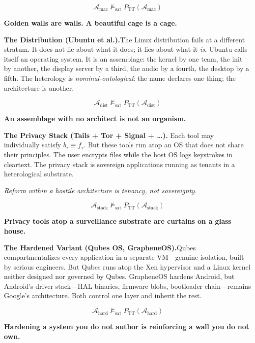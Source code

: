 \documentclass[11pt, oneside]{article}
\newcommand{\isolate}[1]{%
    \vspace{8pt}%
    \begin{center}\itshape #1\end{center}%
    \vspace{8pt}%
}
\newcommand{\verdict}[1]{%
    \vspace{10pt}%
    \begin{center}\textcolor{LogosGold}{\textbf{#1}}\end{center}%
    \vspace{10pt}%
}
\begin{document}
\[
\mathcal{A}_{\mathrm{mac}} \not\models_{\mathrm{sat}}
P_{\mathrm{TT}}(\mathcal{A}_{\mathrm{mac}}) \tag{TT}
\]

\verdict{Golden walls are walls. A beautiful cage is a cage.}

\noindent\textbf{The Distribution (Ubuntu et al.).}\quad The Linux
distribution fails at a different stratum. It does not lie about what
it does; it lies about what it \textit{is}. Ubuntu calls itself an
operating system. It is an assemblage: the kernel by one team, the init
by another, the display server by a third, the audio by a fourth, the
desktop by a fifth. The heterology is \textit{nominal-ontological}: the name
declares one thing; the architecture is another.

\[
\mathcal{A}_{\mathrm{dist}} \not\models_{\mathrm{sat}}
P_{\mathrm{TT}}(\mathcal{A}_{\mathrm{dist}}) \tag{TT}
\]

\verdict{An assemblage with no architect is not an organism.}

\noindent\textbf{The Privacy Stack (Tails + Tor + Signal + \ldots).}\quad
Each tool may individually satisfy $b_\tau \equiv f_\tau$. But these
tools run atop an OS that does not share their principles. The user
encrypts files while the host OS logs keystrokes in cleartext. The
privacy stack is sovereign applications running as
tenants in a heterological substrate.

\isolate{Reform within a hostile architecture is tenancy, not sovereignty.}

\[
\mathcal{A}_{\mathrm{stack}} \not\models_{\mathrm{sat}}
P_{\mathrm{TT}}(\mathcal{A}_{\mathrm{stack}}) \tag{TT}
\]

\verdict{Privacy tools atop a surveillance substrate are curtains on a
glass house.}

\noindent\textbf{The Hardened Variant (Qubes OS, GrapheneOS).}\quad Qubes
compartmentalizes every application in a separate VM---genuine isolation,
built by serious engineers. But Qubes runs atop the Xen hypervisor and a
Linux kernel neither designed nor governed by Qubes. GrapheneOS hardens Android, but Android's driver
stack---HAL binaries, firmware blobs, bootloader chain---remains
Google's architecture. Both control one layer and inherit the rest.

\[
\mathcal{A}_{\mathrm{hard}} \not\models_{\mathrm{sat}}
P_{\mathrm{TT}}(\mathcal{A}_{\mathrm{hard}}) \tag{TT}
\]

\verdict{Hardening a system you do not author is reinforcing a wall you
do not own.}
\end{document}

